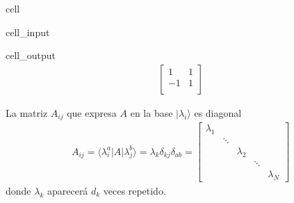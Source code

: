 \documentclass[letterpaper,10pt,english]{jupyterBook}
\newcommand{\bra}[1]{\langle #1|}
\newcommand{\ket}[1]{|#1\rangle}
\begin{document}
\begin{sphinxuseclass}{cell}\begin{sphinxVerbatimInput}

\begin{sphinxuseclass}{cell_input}
\begin{sphinxVerbatim}[commandchars=\\\{\}]
  \PYG{p}{[}\PYG{p}{]}\PYG{p}{[}\PYG{p}{]}

\end{sphinxVerbatim}

\end{sphinxuseclass}\end{sphinxVerbatimInput}
\begin{sphinxVerbatimOutput}

\begin{sphinxuseclass}{cell_output}\begin{equation*}
\begin{split}\begin{bmatrix}
1 & 1  \\
 -1 & 1  \\
 \end{bmatrix}
\end{split}
\end{equation*}
\end{sphinxuseclass}\end{sphinxVerbatimOutput}

\end{sphinxuseclass}
\sphinxAtStartPar
La matriz \(A_{ij}\) que expresa \(A\) en la base \(\ket{\lambda_i}\) es diagonal
\begin{equation*}
\begin{split}
A_{ij} = \bra{\lambda^a_i} A\ket{\lambda^b_j} =  \lambda_k \delta_{kj} \delta_{ab} =\begin{bmatrix} \lambda_1 &  &  &  &  \\ & \ddots & & & \\ & & \lambda_2 & &  \\&  & & \ddots & \\  & & & &  \lambda_N \end{bmatrix}
\end{split}
\end{equation*}
\sphinxAtStartPar
donde \(\lambda_k\) aparecerá \(d_k\) veces repetido.
\end{document}
